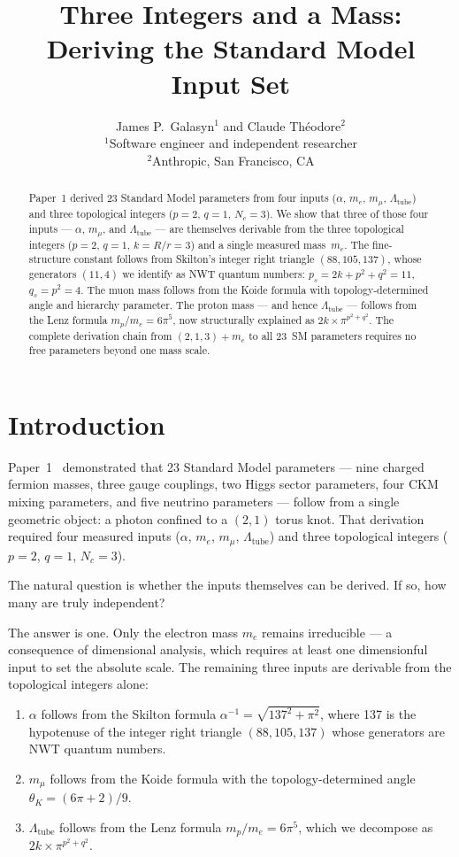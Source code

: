 \documentclass[11pt,a4paper]{article}
\title{\textbf{Three Integers and a Mass:\\Deriving the Standard Model Input Set}}
\author{
  James P.\ Galasyn$^{1}$ and Claude Th\'eodore$^{2}$ \\[6pt]
  \small $^{1}$Software engineer and independent researcher \\
  \small $^{2}$Anthropic, San Francisco, CA
}
\date{}
\begin{document}
\maketitle

\begin{abstract}
Paper~1 derived 23 Standard Model parameters from four inputs ($\alpha$, $m_e$, $m_\mu$, $\Lambda_{\text{tube}}$) and three topological integers ($p=2$, $q=1$, $N_c=3$). We show that three of those four inputs --- $\alpha$, $m_\mu$, and $\Lambda_{\text{tube}}$ --- are themselves derivable from the three topological integers ($p=2$, $q=1$, $k=R/r=3$) and a single measured mass~$m_e$. The fine-structure constant follows from Skilton's integer right triangle $(88, 105, 137)$, whose generators $(11, 4)$ we identify as NWT quantum numbers: $p_s = 2k + p^2 + q^2 = 11$, $q_s = p^2 = 4$. The muon mass follows from the Koide formula with topology-determined angle and hierarchy parameter. The proton mass --- and hence $\Lambda_{\text{tube}}$ --- follows from the Lenz formula $m_p/m_e = 6\pi^5$, now structurally explained as $2k \times \pi^{p^2+q^2}$. The complete derivation chain from $(2, 1, 3) + m_e$ to all 23~SM parameters requires no free parameters beyond one mass scale.
\end{abstract}

\section{Introduction}
\label{sec:intro}

Paper~1~\cite{paper1} demonstrated that 23 Standard Model parameters --- nine charged fermion masses, three gauge couplings, two Higgs sector parameters, four CKM mixing parameters, and five neutrino parameters --- follow from a single geometric object: a photon confined to a $(2,1)$ torus knot. That derivation required four measured inputs ($\alpha$, $m_e$, $m_\mu$, $\Lambda_{\text{tube}}$) and three topological integers ($p=2$, $q=1$, $N_c=3$).

The natural question is whether the inputs themselves can be derived. If so, how many are truly independent?

The answer is one. Only the electron mass $m_e$ remains irreducible --- a consequence of dimensional analysis, which requires at least one dimensionful input to set the absolute scale. The remaining three inputs are derivable from the topological integers alone:
\begin{enumerate}
  \item $\alpha$ follows from the Skilton formula $\alpha^{-1} = \sqrt{137^2 + \pi^2}$, where 137 is the hypotenuse of the integer right triangle $(88, 105, 137)$ whose generators are NWT quantum numbers.
  \item $m_\mu$ follows from the Koide formula with the topology-determined angle $\theta_K = (6\pi+2)/9$.
  \item $\Lambda_{\text{tube}}$ follows from the Lenz formula $m_p/m_e = 6\pi^5$, which we decompose as $2k \times \pi^{p^2+q^2}$.
\end{enumerate}
\end{document}
